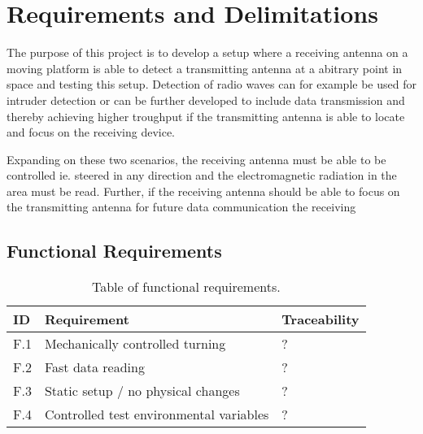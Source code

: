 \chapter{Requirements and Delimitations}
The purpose of this project is to develop a setup where a receiving antenna on a moving platform is able to detect a transmitting antenna at a abitrary point in space and testing this setup. Detection of radio waves can for example be used for intruder detection or can be further developed to include data transmission and thereby achieving higher troughput if the transmitting antenna is able to locate and focus on the receiving device. 

Expanding on these two scenarios, the receiving antenna must be able to be controlled ie. steered in any direction and the electromagnetic radiation in the area must be read. Further, if the receiving antenna should be able to focus on the transmitting antenna for future data communication the receiving 

\section{Functional Requirements}
\begin{table}[H]
    \centering
    \begin{tabular}{l|l|l} 
        \textbf{ID} & \textbf{Requirement} & \textbf{Traceability} \\
        \hline
        F.1 & Mechanically controlled turning & ? \\
        F.2 & Fast data reading & ? \\
        F.3 & Static setup / no physical changes & ? \\
        F.4 & Controlled test environmental variables & ? \\
    \end{tabular}
    \caption{Table of functional requirements.}
    \label{tab:func_req}
\end{table}

